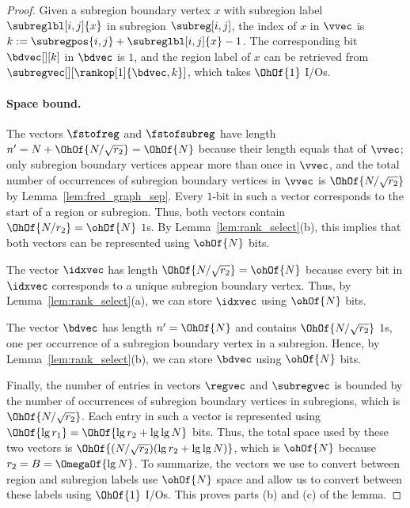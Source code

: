 \begin{proof}
  Given a subregion boundary vertex $x$ with subregion label
  $\subreglbl[i,j]{x}$ in subregion $\subreg[i,j]$, the index of $x$ in
  $\vvec$ is $k := \subregpos{i,j} + \subreglbl[i,j]{x} - 1$.
  The corresponding bit $\bdvec[][k]$ in $\bdvec$ is $1$, and the
  region label of $x$ can be retrieved from
  $\subregvec[][\rankop[1]{\bdvec,k}]$, which takes $\OhOf{1}$ I/Os.

  \paragraph{Space bound.}

  The vectors $\fstofreg$ and $\fstofsubreg$ have length
  $n' = N + \OhOf{N / \sqrt{\subregsz}} = \OhOf{N}$ because their length
  equals that of $\vvec$; only subregion boundary vertices appear more
  than once in $\vvec$, and the total number of occurrences of subregion
  boundary vertices in $\vvec$ is $\OhOf{N / \sqrt{\subregsz}}$ by
  Lemma~\ref{lem:fred_graph_sep}.
  Every $1$-bit in such a vector corresponds to the start of a region
  or subregion.
  Thus, both vectors contain $\OhOf{N / \subregsz} = \ohOf{N}$ $1$s.
  By Lemma~\ref{lem:rank_select}(b), this implies that both vectors can
  be represented using $\ohOf{N}$ bits.

  The vector $\idxvec$ has length $\OhOf{N / \sqrt{\subregsz}} = \ohOf{N}$
  because every bit in $\idxvec$ corresponds to a unique subregion boundary
  vertex.
  Thus, by Lemma~\ref{lem:rank_select}(a), we can store $\idxvec$ using
  $\ohOf{N}$ bits.

  The vector $\bdvec$ has length $n' = \OhOf{N}$ and contains
  $\OhOf{N / \sqrt{\subregsz}}$ $1$s, one per occurrence of a subregion boundary
  vertex in a subregion.
  Hence, by Lemma~\ref{lem:rank_select}(b), we can store $\bdvec$ using
  $\ohOf{N}$ bits.

  Finally, the number of entries in vectors $\regvec$ and $\subregvec$ is
  bounded by the number of occurrences of subregion boundary vertices in
  subregions, which is $\OhOf{N / \sqrt{\subregsz}}$.
  Each entry in such a vector is represented using
  $\OhOf{\lg \regsz} = \OhOf{\lg\subregsz + \lg \lg N}$ bits.
  Thus, the total space used by these two vectors is
  $\OhOf{(N / \sqrt{\subregsz})(\lg \subregsz + \lg \lg N)}$,
  which is $\ohOf{N}$ because $\subregsz = B = \OmegaOf{\lg N}$.
  To summarize, the vectors we use to convert between region and subregion
  labels use $\ohOf{N}$ space and allow us to convert between these labels
  using $\OhOf{1}$ I/Os.
  This proves parts (b) and (c) of the lemma.


\end{proof}
